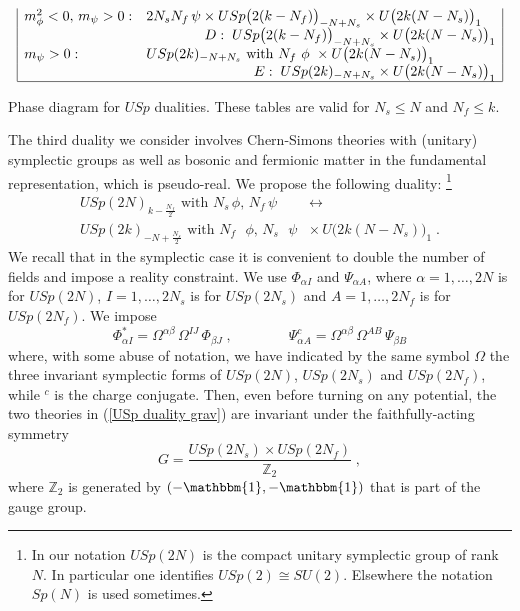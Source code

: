 \documentclass[a4paper, 12pt]{article}
\numberwithin{equation}{section}
\newcommand{\be}{\begin{equation}} \newcommand{\ee}{\end{equation}}
\newcommand{\bZ}{\mathbb{Z}}
\newcommand{\unit}{\mathbbm{1}}
\begin{document}
\begin{table}[t!]
{$$\begin{array}{|lll|}
m_\phi^2<0,\, m_\psi>0: & 2 N_s N_f \, \psi \times USp\big(2(k-N_f)\big)_{-N + N_s} \times U\big( 2k(N-N_s) \big)_1 & \\
	& \multicolumn{2}{r|}{D:\; USp\big(2(k-N_f)\big)_{-N + N_s} \times U\big( 2k(N-N_s) \big)_1} \\
m_\psi>0: &	USp(2k)_{-N+N_s} \text{ with $N_f$ $\phi$ } \times U\big( 2k(N-N_s) \big)_1 & \\
	& \multicolumn{2}{r|}{E:\; USp(2k)_{-N+N_s} \times U\big( 2k(N-N_s)\big)_1} \\
\hline
\end{array}
$$
}
\caption{Phase diagram for $USp$ dualities. These tables are valid for $N_s \leq N$ and $N_f \leq k$.
\label{tab: USp dualities}}
\end{table}

The third duality we consider involves Chern-Simons theories with (unitary) symplectic groups as well as bosonic and fermionic matter in the fundamental representation, which is pseudo-real. We propose the following duality:%
\footnote{In our notation $USp(2N)$ is the compact unitary symplectic group of rank $N$. In particular one identifies $USp(2) \cong SU(2)$. Elsewhere the notation $Sp(N)$ is used sometimes.}
\begin{multline}
\label{USp duality grav}
USp(2N)_{k - \frac{N_f}2} \text{ with } N_s\, \phi,\, N_f\, \psi \qquad\longleftrightarrow \\
USp(2k)_{-N + \frac{N_s}2} \text{ with $N_f$ $\phi$, $N_s$ $\psi$ } \times U\big( 2k(N-N_s) \big)_1 \;.
\end{multline}
We recall that in the symplectic case it is convenient to double the number of fields and impose a reality constraint. We use $\Phi_{\alpha I}$ and $\Psi_{\alpha A}$, where $\alpha=1,\dots,2N$ is for $USp(2N)$, $I = 1, \dots, 2N_s$ is for $USp(2N_s)$ and $A =1,\dots, 2N_f$ is for $USp(2N_f)$. We impose
\be
\Phi_{\alpha I}^* = \Omega^{\alpha\beta} \, \Omega^{IJ} \, \Phi_{\beta J} \;,\qquad\qquad \Psi_{\alpha A}^c = \Omega^{\alpha\beta} \, \Omega^{AB} \, \Psi_{\beta B}
\ee
where, with some abuse of notation, we have indicated by the same symbol $\Omega$ the three invariant symplectic forms of $USp(2N)$, $USp(2N_s)$ and $USp(2N_f)$, while $^c$ is the charge conjugate. Then, even before turning on any potential, the two theories in (\ref{USp duality grav}) are invariant under the faithfully-acting symmetry
\be
G = \frac{USp(2N_s) \times USp(2N_f)}{\bZ_2} \;,
\ee
where $\bZ_2$ is generated by $(-\unit, -\unit)$ that is part of the gauge group.
\end{document}

